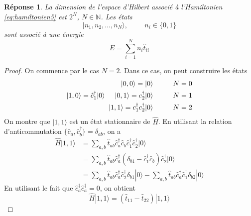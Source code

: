\documentclass{article}
\numberwithin{equation}{section}
\theoremstyle{solution}
\newtheorem{solution}{Réponse}[section]
\begin{document}
\subsection{}
\begin{solution}
La dimension de l'espace d'Hilbert associé à l'Hamiltonien \eqref{eq:hamiltonien5} est $2^{N}$, $N \in \mathbb{N}$. Les états 
\begin{equation}
        | n_1, n_2, \dots, n_N \rangle, \hspace{1cm} n_i \in \{0, 1\}
\end{equation} 
sont associé à une énergie
\begin{equation}
        E = \sum_{i = 1}^{N}n_{i}\hat{t}_{ii}
\end{equation} 
\end{solution}
\begin{proof}
On commence par le cas $N=2$. Dans ce cas, on peut construire les états
\begin{align*}
        | 0, 0 \rangle  = | 0 \rangle \hspace{1cm} N = 0 \\
        | 1, 0 \rangle = \hat{c}_1^{\dagger}| 0 \rangle   \hspace{.5cm} | 0, 1 \rangle = c_2^{\dagger}| 0 \rangle  \hspace{1cm} N = 1 \\
        | 1, 1 \rangle = c_1^{\dagger}c_2^{\dagger}| 0 \rangle  \hspace{1cm} N = 2
\end{align*}
On montre que $| 1, 1 \rangle $ est un état stationnaire de $\hat{H}$.
En utilisant la relation d'anticommutation $\{\hat{c}_a, \hat{c}_b^{\dagger}\} = \delta_{ab}$, on a
\begin{align*}
       \hat{H}| 1, 1 \rangle  &= \sum_{a, b} \hat{t}_{ab}\hat{c}^{\dagger}_a \hat{c}_b \hat{c}_1^{\dagger}\hat{c}_2^{\dagger} | 0 \rangle  \\
                        &= \sum_{a, b} \hat{t}_{ab} \hat{c}^{\dagger}_a(\delta_{b1} - \hat{c}_1^{\dagger} \hat{c}_b)\hat{c}^{\dagger}_2 | 0 \rangle  \\
                        &= \sum_{a, b} \hat{t}_{ab} \hat{c}^{\dagger}_{a}\hat{c}^{\dagger}_2\delta_{b1}| 0 \rangle  - \sum_{a,b}\hat{t}_{ab}\hat{c}^{\dagger}_a\hat{c}^{\dagger}_1 \delta_{b2} | 0 \rangle 
\end{align*}
En utilisant le fait que $\hat{c}_{a}^{\dagger}\hat{c}_a^{\dagger} = 0$, on obtient
\begin{equation}
        \hat{H}| 1, 1 \rangle =  (\hat{t}_{11}  - \hat{t}_{22})| 1, 1 \rangle 

\end{equation}
\end{proof}
\end{document}
